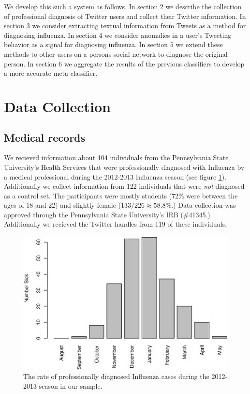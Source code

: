 \documentclass{acm_proc_article-sp}
\begin{document}
We develop this such a system as follows. In section 2 we describe the collection of professional diagnosis of Twitter users and collect their Twitter information. In section 3 we consider extracting textual information from Tweets as a method for diagnosing influenza. In section 4 we consider anomalies in a user's Tweeting behavior as a signal for diagnosing influenza. In section 5 we extend these methods to other users on a persons social network to diagnose the original person. In section 6 we aggregate the results of the previous classifiers to develop a more accurate meta-classifier.






\section{Data Collection}
\subsection{Medical records}
We recieved information about 104 individuals from the Pennsylvania State University's Health Services that were professionally diagnosed with Influenza by a medical professional during the 2012-2013 Influenza season (see figure \ref{fig:flu_rate}).  Additionally we collect information from 122 individuals that were \emph{not} diagnosed as a control set. The participants were mostly students (\(72\%\) were between the ages of 18 and 22) and slightly female (\(133 / 226 \approx 58.8\%\).) Data collection was approved through the Pennsylvania State University's IRB (\#41345.) Additionally we recieved the Twitter handles from 119 of these individuals.

\begin{figure} [h]
\centering
\includegraphics[width=.45\textwidth]{figs/sick_count.eps}
\caption{The rate of professionally diagnosed Influenza cases during the 2012-2013 season in our sample.}
\label{fig:flu_rate}
\end{figure}
\end{document}
